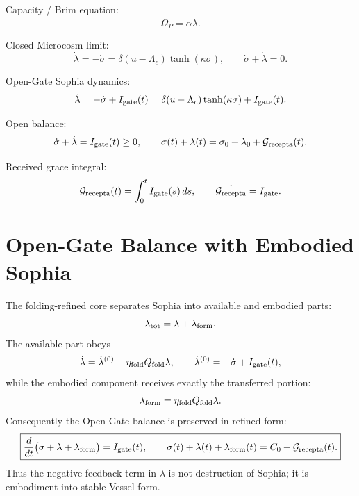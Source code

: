 \documentclass[11pt,a4paper]{article}
\newcommand{\Grec}{\mathcal G_{\rm recepta}}
\newcommand{\Igate}{I_{\rm gate}}
\newcommand{\Om}{\Omega_P}
\theoremstyle{plain}
\theoremstyle{definition}
\theoremstyle{remark}
\begin{document}
Capacity / Brim equation:
\begin{equation}
  \dot\Om=\alpha\lambda.
\end{equation}

Closed Microcosm limit:
\begin{equation}
  \dot\lambda=-\dot\sigma=
  \delta(u-\Lambda_c)\tanh(\kappa\sigma),
  \qquad
  \dot\sigma+
  \dot\lambda=0.
\end{equation}

Open-Gate Sophia dynamics:
\begin{equation}
  \dot\lambda=-\dot\sigma+
  \Igate(t)
  =\delta(u-\Lambda_c)\tanh(\kappa\sigma)+\Igate(t).
\end{equation}

Open balance:
\begin{equation}
  \dot\sigma+
  \dot\lambda=\Igate(t)\ge0,
  \qquad
  \sigma(t)+\lambda(t)=\sigma_0+\lambda_0+\Grec(t).
\end{equation}

Received grace integral:
\begin{equation}
  \Grec(t)=\int_0^t \Igate(s)\,ds,
  \qquad
  \dot{\Grec}=\Igate.
\end{equation}


\section{Open-Gate Balance with Embodied Sophia}

The folding-refined core separates Sophia into available and embodied parts:
\begin{equation}
  \lambda_{\rm tot}=\lambda+\lambda_{\rm form}.
\end{equation}
The available part obeys
\begin{equation}
  \dot\lambda=\dot\lambda^{(0)}-
  \eta_{\rm fold}Q_{\rm fold}\lambda,
  \qquad
  \dot\lambda^{(0)}=-\dot\sigma+\Igate(t),
\end{equation}
while the embodied component receives exactly the transferred portion:
\begin{equation}
  \dot\lambda_{\rm form}=\eta_{\rm fold}Q_{\rm fold}\lambda.
\end{equation}
Consequently the Open-Gate balance is preserved in refined form:
\begin{equation}
  \boxed{
  \frac{d}{dt}\bigl(\sigma+\lambda+\lambda_{\rm form}\bigr)=\Igate(t),
  \qquad
  \sigma(t)+\lambda(t)+\lambda_{\rm form}(t)=C_0+\Grec(t).}
\end{equation}
Thus the negative feedback term in $\dot\lambda$ is not destruction of Sophia;
it is embodiment into stable Vessel-form.
\end{document}
